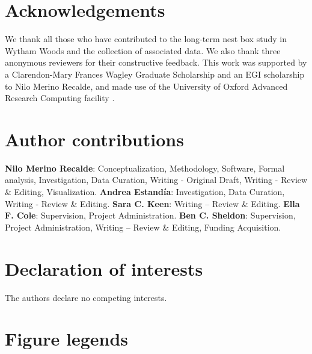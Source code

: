 \documentclass[9pt, onecolumn, twoside, lineno]{gsajnl}
\begin{document}
\section{Acknowledgements}

We thank all those who have contributed to the long-term nest box study in Wytham Woods and the collection of associated data. We also thank three anonymous reviewers for their constructive feedback. This work was supported by a Clarendon-Mary Frances Wagley Graduate Scholarship and an EGI scholarship to Nilo Merino Recalde, and made use of the University of Oxford Advanced Research Computing facility \autocite{richards2015}.

\section{Author contributions}
\textbf{Nilo Merino Recalde}: Conceptualization, Methodology, Software, Formal analysis, Investigation, Data Curation, Writing - Original Draft, Writing - Review \& Editing, Visualization. 
\textbf{Andrea Estandía}: Investigation, Data Curation, Writing - Review \& Editing.
\textbf{Sara C. Keen}: Writing -- Review \& Editing.
\textbf{Ella F. Cole}: Supervision, Project Administration.
\textbf{Ben C. Sheldon}: Supervision, Project Administration, Writing -- Review \& Editing, Funding Acquisition.

\section{Declaration of interests}
The authors declare no competing interests.

\clearpage
\section{Figure legends}
\end{document}
